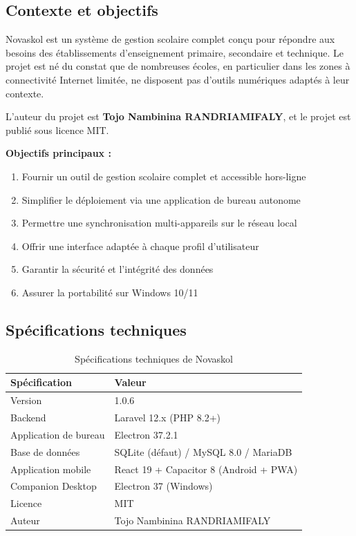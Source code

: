 \documentclass[12pt,a4paper,twoside]{report}
\begin{document}
\subsection{Contexte et objectifs}

Novaskol est un système de gestion scolaire complet conçu pour répondre aux besoins des établissements d'enseignement primaire, secondaire et technique. Le projet est né du constat que de nombreuses écoles, en particulier dans les zones à connectivité Internet limitée, ne disposent pas d'outils numériques adaptés à leur contexte.

L'auteur du projet est \textbf{Tojo Nambinina RANDRIAMIFALY}, et le projet est publié sous licence MIT.

\textbf{Objectifs principaux :}
\begin{enumerate}
    \item Fournir un outil de gestion scolaire complet et accessible hors-ligne
    \item Simplifier le déploiement via une application de bureau autonome
    \item Permettre une synchronisation multi-appareils sur le réseau local
    \item Offrir une interface adaptée à chaque profil d'utilisateur
    \item Garantir la sécurité et l'intégrité des données
    \item Assurer la portabilité sur Windows 10/11
\end{enumerate}

\subsection{Spécifications techniques}

\begin{table}[h]
\centering
\caption{Spécifications techniques de Novaskol}
\begin{tabular}{lp{10cm}}
\toprule
Spécification & Valeur \\
\midrule
Version & 1.0.6 \\
Backend & Laravel 12.x (PHP 8.2+) \\
Application de bureau & Electron 37.2.1 \\
Base de données & SQLite (défaut) / MySQL 8.0 / MariaDB \\
Application mobile & React 19 + Capacitor 8 (Android + PWA) \\
Companion Desktop & Electron 37 (Windows) \\
Licence & MIT \\
Auteur & Tojo Nambinina RANDRIAMIFALY \\
\bottomrule
\end{tabular}
\end{table}
\end{document}
